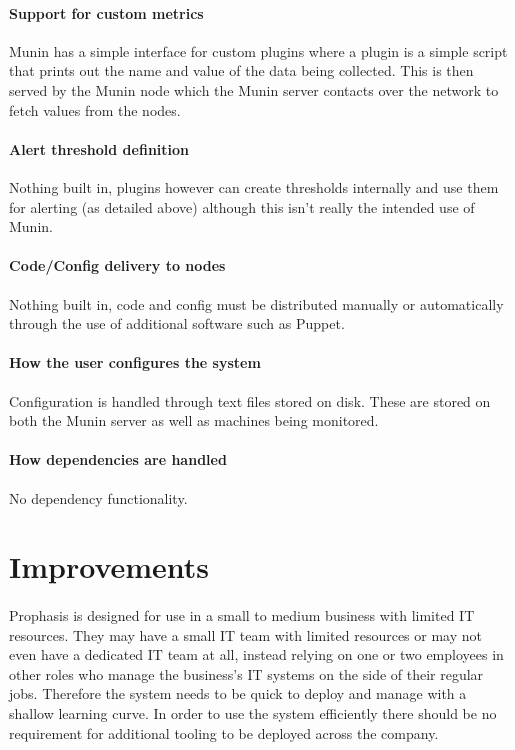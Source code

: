\documentclass[bsc,logo,twoside]{infthesis}
\begin{document}
\paragraph*{Support for custom metrics}
Munin has a simple interface for custom plugins where a plugin is a simple script that prints out the
name and value of the data being collected.  This is then served by the Munin node which the Munin
server contacts over the network to fetch values from the nodes.

\paragraph*{Alert threshold definition}
Nothing built in, plugins however can create thresholds internally and use them for alerting (as
detailed above) although this isn't really the intended use of Munin.

\paragraph*{Code/Config delivery to nodes}
Nothing built in, code and config must be distributed manually or automatically through the use of
additional software such as Puppet.

\paragraph*{How the user configures the system}
Configuration is handled through text files stored on disk.  These are stored on both the Munin 
server as well as machines being monitored.

\paragraph*{How dependencies are handled}
No dependency functionality.

\section{Improvements}
\paragraph*{}
	Prophasis is designed for use in a small to medium business with limited IT
	resources.  They may have a small IT team with limited resources or may not
	even have a dedicated IT team at all, instead relying on one or two employees
	in other roles who manage the business's IT systems on the side of their
	regular jobs. Therefore the system needs to be quick to deploy and manage with
	a shallow learning curve. In order to use the system efficiently there should
	be no requirement for additional tooling to be deployed across the company.
	
\end{document}
